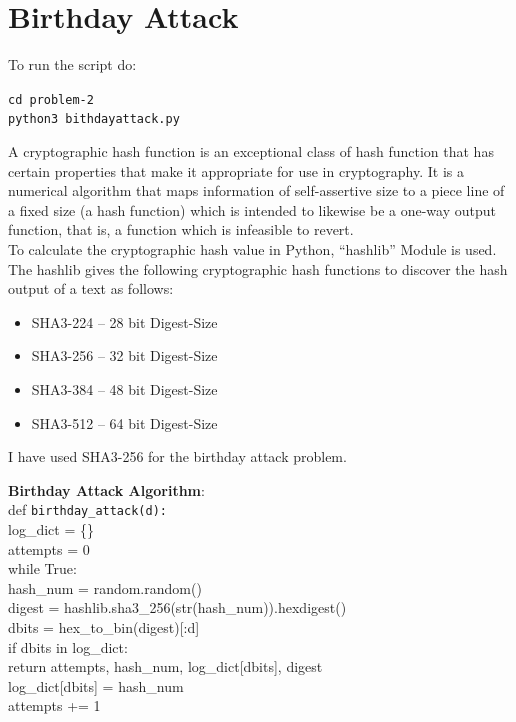 \documentclass{exam}
\newcommand\tab[1][0.2cm]{\hspace*{#1}}
\begin{document}
\section{Birthday Attack}
To run the script do:
\begin{center}
    \texttt{cd problem-2} \\
    \texttt{python3 bithdayattack.py}
\end{center}
A cryptographic hash function is an exceptional class of hash function that has certain properties that make it appropriate for use in cryptography. It is a numerical algorithm that maps information of self-assertive size to a piece line of a fixed size (a hash function) which is intended to likewise be a one-way output function, that is, a function which is infeasible to revert. \vspace{0.05in} \\
To calculate the cryptographic hash value in Python, “hashlib” Module is used. The hashlib gives the following cryptographic hash functions to discover the hash output of a text as follows:
\begin{itemize}
    \item SHA3-224 – 28 bit Digest-Size
    \item SHA3-256 – 32 bit Digest-Size
    \item SHA3-384 – 48 bit Digest-Size
    \item SHA3-512 – 64 bit Digest-Size
\end{itemize}
I have used SHA3-256 for the birthday attack problem.
\begin{framed}
\textbf{Birthday Attack Algorithm}: \vspace{0.05in} \\
def \texttt{birthday\_attack(d):} \vspace{0.05in} \\
\tab log\_dict = \{\} \vspace{0.05in} \\
\tab attempts = 0 \vspace{0.05in} \\
\tab while True: \vspace{0.05in} \\
\tab \tab hash\_num = random.random() \vspace{0.05in} \\
\tab \tab digest = hashlib.sha3\_256(str(hash\_num)).hexdigest() \vspace{0.05in} \\
\tab \tab dbits = hex\_to\_bin(digest)[:d] \vspace{0.05in} \\
\tab \tab if dbits in log\_dict: \vspace{0.05in} \\
\tab \tab \tab return attempts, hash\_num, log\_dict[dbits], digest \vspace{0.05in} \\
\tab \tab log\_dict[dbits] = hash\_num \vspace{0.05in} \\
\tab \tab attempts += 1
\end{framed}
\end{document}
